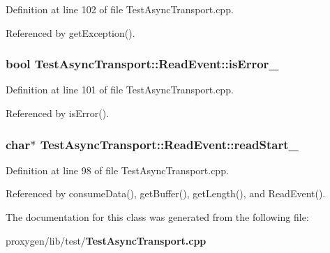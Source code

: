 Definition at line 102 of file Test\+Async\+Transport.\+cpp.



Referenced by get\+Exception().

\subsubsection[{is\+Error\+\_\+}]{\setlength{\rightskip}{0pt plus 5cm}bool Test\+Async\+Transport\+::\+Read\+Event\+::is\+Error\+\_\+\hspace{0.3cm}{\ttfamily [private]}}\label{classTestAsyncTransport_1_1ReadEvent_a99d81159f2478c02d98a159d127e0184}


Definition at line 101 of file Test\+Async\+Transport.\+cpp.



Referenced by is\+Error().

\subsubsection[{read\+Start\+\_\+}]{\setlength{\rightskip}{0pt plus 5cm}char$\ast$ Test\+Async\+Transport\+::\+Read\+Event\+::read\+Start\+\_\+\hspace{0.3cm}{\ttfamily [private]}}\label{classTestAsyncTransport_1_1ReadEvent_a0200e18d4198e61c7236c315563e0cdf}


Definition at line 98 of file Test\+Async\+Transport.\+cpp.



Referenced by consume\+Data(), get\+Buffer(), get\+Length(), and Read\+Event().



The documentation for this class was generated from the following file\+:\begin{DoxyCompactItemize}
\item 
proxygen/lib/test/{\bf Test\+Async\+Transport.\+cpp}\end{DoxyCompactItemize}
